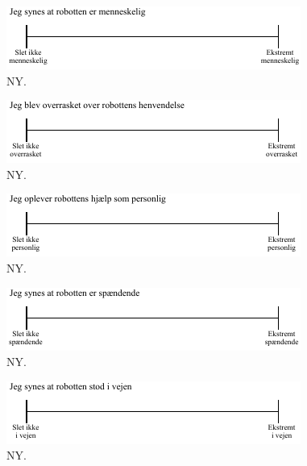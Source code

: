 %
\begin{figure}[H]
\centering
\includegraphics[width =\textwidth]{Figure/UdvalgteSkalaer/MenneskeligR} 
\caption{NY.}
\label{fig:SkalaMenneskeligR}
\end{figure}
\noindent
%

%
\begin{figure}[H]
\centering
\includegraphics[width =\textwidth]{Figure/UdvalgteSkalaer/OverrasketOverR} 
\caption{NY.}
\label{fig:SkalaOverrasketOverR}
\end{figure}
\noindent
%

%
\begin{figure}[H]
\centering
\includegraphics[width =\textwidth]{Figure/UdvalgteSkalaer/PersonligHjaelp} 
\caption{NY.}
\label{fig:SkalaPersonligHjaelp}
\end{figure}
\noindent
%

%
\begin{figure}[H]
\centering
\includegraphics[width =\textwidth]{Figure/UdvalgteSkalaer/RerSpaendende} 
\caption{NY.}
\label{fig:SkalaRerSpaendende}
\end{figure}
\noindent
%

%
\begin{figure}[H]
\centering
\includegraphics[width =\textwidth]{Figure/UdvalgteSkalaer/RobottenErIVejen} 
\caption{NY.}
\label{fig:SkalaRerIVejen}
\end{figure}
\noindent
%

